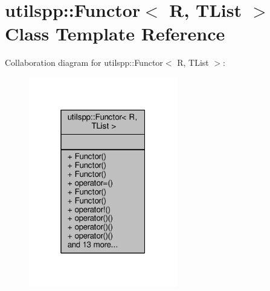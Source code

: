 \hypertarget{classutilspp_1_1Functor}{\section{utilspp\-:\-:Functor$<$ R, T\-List $>$ Class Template Reference}
\label{classutilspp_1_1Functor}
}


Collaboration diagram for utilspp\-:\-:Functor$<$ R, T\-List $>$\-:
\nopagebreak
\begin{figure}[H]
\begin{center}
\leavevmode
\includegraphics[width=184pt]{classutilspp_1_1Functor__coll__graph}
\end{center}
\end{figure}
